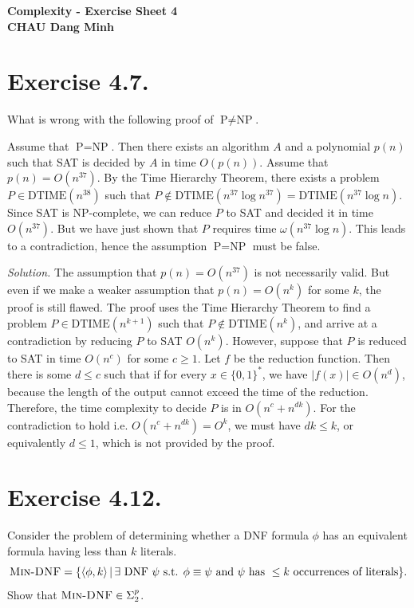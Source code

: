 \begin{center}
  {\bf
    \vspace{0.5cm}
    Complexity - Exercise Sheet 4\\
    \vspace{0.2cm}
    CHAU Dang Minh
  }
\end{center}

\section{Exercise 4.7.} What is wrong with the following proof of $\text{P}\neq \text{NP}$.

Assume that $\text{P}=\text{NP}$. Then there exists an algorithm $A$ and a polynomial $p(n)$ such that \textsc{SAT} is decided by $A$ in time $O(p(n))$. Assume that $p(n) = O(n^{37})$. By the Time Hierarchy Theorem, there exists a problem $P\in\text{DTIME}(n^{38})$ such that $P\notin\text{DTIME}(n^{37}\log{n^{37}}) = \text{DTIME}(n^{37}\log n)$. Since \textsc{SAT} is NP-complete, we can reduce $P$ to \textsc{SAT} and decided it in time $O(n^{37})$. But we have just shown that $P$ requires time $\omega(n^{37}\log n)$. This leads to a contradiction, hence the assumption $\text{P}=\text{NP}$ must be false.

\textit{Solution.} The assumption that $p(n) = O(n^{37})$ is not necessarily valid. But even if we make a weaker assumption that $p(n) = O(n^k)$ for some $k$, the proof is still flawed. The proof uses the Time Hierarchy Theorem to find a problem $P\in \text{DTIME}(n^{k+1})$ such that $P\notin \text{DTIME}(n^k)$, and arrive at a contradiction by reducing $P$ to \textsc{SAT} $O(n^k)$. However, suppose that $P$ is reduced to \textsc{SAT} in time $O(n^c)$ for some $c \ge 1$. Let $f$ be the reduction function. Then there is some $d\le c$ such that if for every $x\in\{0,1\}^*$, we have $|f(x)|\in O(n^d)$, because the length of the output cannot exceed the time of the reduction. Therefore, the time complexity to decide $P$ is in $O(n^c+n^{dk})$. For the contradiction to hold i.e. $O(n^c+n^{dk}) = O^{k}$, we must have $dk \le k$, or equivalently $d \le 1$, which is not provided by the proof.

\section{Exercise 4.12.} Consider the problem of determining whether a DNF formula $\phi$ has an equivalent formula having less than $k$ literals.
$$\textsc{Min-DNF} = \{\langle \phi,k\rangle \,|\, \exists \text{ DNF } \psi \text{ s.t. } \phi \equiv \psi \text{ and } \psi \text{ has } \le k \text{ occurrences of literals}\}.$$
Show that $\textsc{Min-DNF} \in \Sigma_2^p$.

